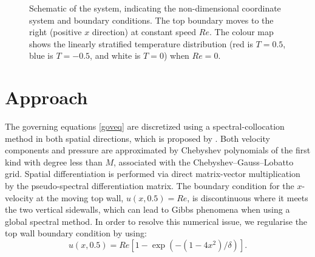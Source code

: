 \documentclass[12pt]{article}
\newcommand{\Rey}{\mathit{Re}}
\begin{document}
\begin{figure}[t]
\caption{Schematic of the system, indicating the non-dimensional
         coordinate system and boundary conditions. The top boundary moves to
         the right (positive $x$ direction) at constant speed $\Rey$. The
         colour map shows the linearly stratified temperature distribution
         (red is $T=0.5$, blue is $T=-0.5$, and white is $T=0$) when
         $\Rey=0$.}
\label{schematic}
\end{figure}

\section{Approach}
The governing equations \eqref{goveq} are discretized using a
spectral-collocation method in both spatial directions, which is
proposed by \cite{HuRa98}. Both velocity
components and pressure are approximated by Chebyshev polynomials of
the first kind with degree less than $M$, associated with the
Chebyshev--Gauss--Lobatto grid. Spatial differentiation is performed
via direct matrix-vector multiplication by the pseudo-spectral
differentiation matrix.
\noindent
The boundary condition for the $x$-velocity at the moving top wall,
$u(x,0.5)=\Rey$, is discontinuous where it meets the two vertical
sidewalls, which can lead to Gibbs phenomena when using a global
spectral method. In order to resolve this numerical issue, we
regularise the top wall boundary condition by using:
\begin{equation}
u(x,0.5) = \Rey\left[1-\exp{(-(1-4x^{2})/\delta)}\right].
\end{equation} 
\end{document}
